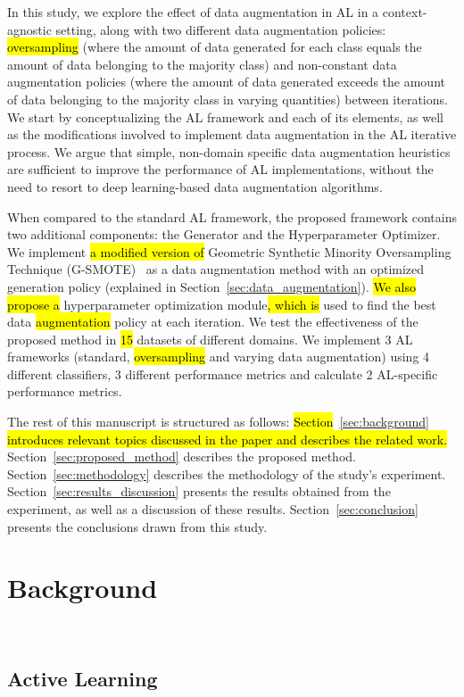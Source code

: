 \documentclass[preprint, 12pt]{elsarticle}
\begin{document}
In this study, we explore the effect of data augmentation in AL in a
context-agnostic setting, along with two different data augmentation policies:
\hl{oversampling} (where the amount of data generated for each class equals
the amount of data belonging to the majority class) and non-constant data
augmentation policies (where the amount of data generated exceeds the amount
of data belonging to the majority class in varying quantities) between
iterations. We start by conceptualizing the AL framework and each of its
elements, as well as the modifications involved to implement data augmentation
in the AL iterative process. We argue that simple, non-domain specific data
augmentation heuristics are sufficient to improve the performance of AL
implementations, without the need to resort to deep learning-based data
augmentation algorithms.

When compared to the standard AL framework, the proposed framework contains
two additional components: the Generator and the Hyperparameter Optimizer. We
implement \hl{a modified version of }Geometric Synthetic Minority Oversampling
Technique (G-SMOTE)~\cite{Douzas2019} as a data augmentation method with an
optimized generation policy (explained in
Section~\ref{sec:data_augmentation}). \hl{We also propose a} hyperparameter
optimization module\hl{, which is} used to find the best data
\hl{augmentation} policy at each iteration. We test the effectiveness of the
proposed method in \hl{15} datasets of different domains. We implement 3 AL
frameworks (standard, \hl{oversampling} and varying data augmentation) using 4
different classifiers, 3 different performance metrics and calculate 2
AL-specific performance metrics. 

The rest of this manuscript is structured as follows:
\hl{Section}~\ref{sec:background} \hl{introduces relevant topics discussed in
the paper and describes the related work.} Section~\ref{sec:proposed_method}
describes the proposed method. Section~\ref{sec:methodology} describes the
methodology of the study's experiment. Section~\ref{sec:results_discussion}
presents the results obtained from the experiment, as well as a discussion of
these results. Section~\ref{sec:conclusion} presents the conclusions drawn
from this study.
 
\section{Background}~\label{sec:background}

\subsection{Active Learning}~\label{sec:active_learning_methods}
\end{document}
